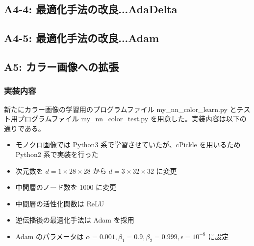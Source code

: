 \documentclass[a4paper,dvipdfmx]{jsarticle}
\begin{document}
\subsection*{A4-4: 最適化手法の改良...AdaDelta}

\subsection*{A4-5: 最適化手法の改良...Adam}

\subsection*{A5: カラー画像への拡張}

\subsubsection*{実装内容}

新たにカラー画像の学習用のプログラムファイル my\_nn\_color\_learn.py とテスト用プログラムファイル my\_nn\_color\_test.py を用意した。実装内容は以下の通りである。

\begin{itemize}
	\item モノクロ画像では Python3 系で学習させていたが、cPickle を用いるため Python2 系で実装を行った
	\item 次元数を $ d=1 \times 28 \times 28 $ から $ d=3 \times 32 \times 32 $ に変更
	\item 中間層のノード数を 1000 に変更
	\item 中間層の活性化関数は ReLU
	\item 逆伝播後の最適化手法は Adam を採用
	\item Adam のパラメータは $\alpha = 0.001, \beta_1 = 0.9, \beta_2 =  0.999, \epsilon = 10^{-8}$ に設定
\end{itemize}
\end{document}
